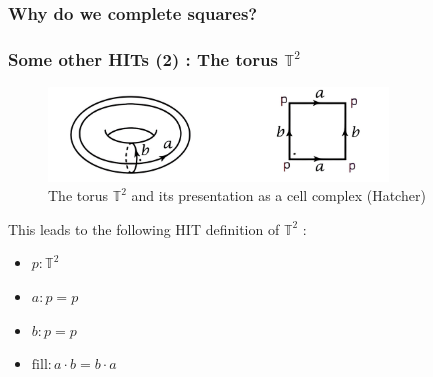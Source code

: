\documentclass{beamer}
\begin{document}
    \begin{frame}[fragile]
        \frametitle{Why do we complete squares?}
        \begin{center}
          \end{center}
    \end{frame}
    \begin{frame}[fragile]
        \frametitle{Some other HITs (2) : The torus $\mathbb{T}^2$}
        \begin{figure}[h]
            \begin{center}
              \includegraphics[height= 2.5cm]{torus.png}
              \caption{The torus $\mathbb{T}^2$ and its presentation as a cell complex (Hatcher)}
            \end{center}
          \end{figure}
        \pause
        This leads to the following HIT definition of $\mathbb{T}^2$ :
        \begin{itemize}
            \item $ p : \mathbb{T}^2$
            \item $a : p = p$
            \item $b : p = p $
            \item $\mathrm{fill} :  a \cdot b = b \cdot a$
        \end{itemize}
    \end{frame}
\end{document}
